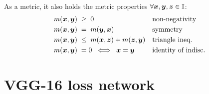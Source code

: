 \documentclass[a4paper,12pt,twoside]{report}
\begin{document}
As a metric, it also holds the metric properties $\forall {\bm{x}},{\bm{y}},{\bm{z}} \in {\mathbb{I}}$:
\begin{align}
    m({\bm{x}},{\bm{y}}) \; &\geq \; 0                && \text{non-negativity} \label{eq: NonNeg}\\
    m({\bm{x}},{\bm{y}}) \; &= \; m({\bm{y}},{\bm{x}})              && \text{symmetry} \label{eq: Sym}\\
    m({\bm{x}},{\bm{y}}) \; &\leq \; m({\bm{x}},{\bm{z}}) + m({\bm{z}},{\bm{y}})  && \text{triangle ineq.} \label{eq: TriIneq}\\
    m({\bm{x}},{\bm{y}}) \; &= 0 \; \iff \; {\bm{x}} = {\bm{y}}     && \text{identity of indisc.} \label{eq: IoI}
\end{align}

\section{VGG-16 loss network}
\end{document}
